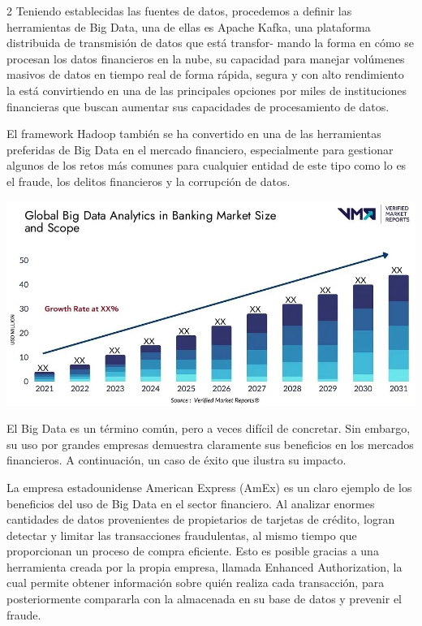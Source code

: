\documentclass[12pt,spanish,Letterpaper,openany]{book}
\begin{document}
\begin {multicols}{2}
Teniendo establecidas las fuentes de datos, procedemos a definir las herramientas de Big Data, una de ellas es Apache Kafka, una plataforma distribuida de transmisión de datos que está transfor-
mando la forma en cómo se procesan los datos financieros en la nube, su capacidad para manejar volúmenes masivos de datos en tiempo real de forma rápida, segura y con alto rendimiento la está convirtiendo en una de las principales opciones por miles de instituciones financieras que buscan aumentar sus capacidades de procesamiento de datos.

El framework Hadoop también se ha convertido en una de las herramientas preferidas de Big Data en el mercado financiero, especialmente para gestionar algunos de los retos más comunes para cualquier entidad de este tipo como lo es el fraude, los delitos financieros y la corrupción de datos.

\begin {flushleft}
\noindent\begin{minipage}[c]{\columnwidth}

\begin{center}\includegraphics[width=1\linewidth]{imagenes_articulos/sp19_01} \end{center}

\end{minipage}
\end {flushleft}

El Big Data es un término común, pero a veces difícil de concretar. Sin embargo, su uso por grandes empresas demuestra claramente sus beneficios en los mercados financieros. A continuación, un caso de éxito que ilustra su impacto.

La empresa estadounidense American Express (AmEx) es un claro ejemplo de los beneficios del uso de Big Data en el sector financiero. Al analizar enormes cantidades de datos provenientes de propietarios de tarjetas de crédito, logran detectar y limitar las transacciones fraudulentas, al mismo tiempo que proporcionan un proceso de compra eficiente. Esto es posible gracias a una herramienta creada por la propia empresa, llamada Enhanced Authorization, la cual permite obtener información sobre quién realiza cada transacción, para posteriormente compararla con la almacenada en su base de datos y prevenir el fraude.


\end{multicols}
\end{document}
